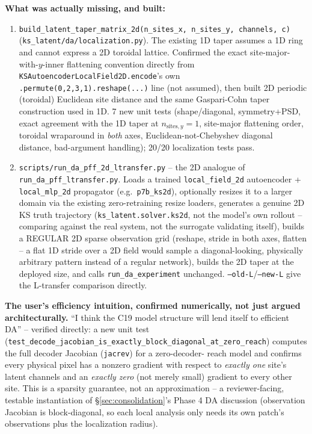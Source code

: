\documentclass[11pt]{article}
\begin{document}
\textbf{What was actually missing, and built:}
\begin{enumerate}[leftmargin=*]
\item \texttt{build\_latent\_taper\_matrix\_2d(n\_sites\_x, n\_sites\_y,
  channels, c)} (\texttt{ks\_latent/da/localization.py}). The existing
  1D taper assumes a 1D ring and cannot express a 2D toroidal lattice.
  Confirmed the exact site-major-with-$y$-inner flattening convention
  directly from \texttt{KSAutoencoderLocalField2D.encode}'s own
  \texttt{.permute(0,2,3,1).reshape(...)} line (not assumed), then built
  2D periodic (toroidal) Euclidean site distance and the same
  Gaspari-Cohn taper construction used in 1D. 7 new unit tests
  (shape/diagonal, symmetry+PSD, exact agreement with the 1D taper at
  $n_{\mathrm{sites},y}{=}1$, site-major flattening order, toroidal
  wraparound in \emph{both} axes, Euclidean-not-Chebyshev diagonal
  distance, bad-argument handling); 20/20 localization tests pass.
\item \texttt{scripts/run\_da\_pff\_2d\_ltransfer.py} -- the 2D analogue
  of \texttt{run\_da\_pff\_ltransfer.py}. Loads a trained
  \texttt{local\_field\_2d} autoencoder + \texttt{local\_mlp\_2d}
  propagator (e.g.\ \texttt{p7b\_ks2d}), optionally resizes it to a
  larger domain via the existing zero-retraining resize loaders,
  generates a genuine 2D KS truth trajectory
  (\texttt{ks\_latent.solver.ks2d}, not the model's own rollout --
  comparing against the real system, not the surrogate validating
  itself), builds a REGULAR 2D sparse observation grid (reshape,
  stride in both axes, flatten -- a flat 1D stride over a 2D field would
  sample a diagonal-looking, physically arbitrary pattern instead of a
  regular network), builds the 2D taper at the deployed size, and calls
  \texttt{run\_da\_experiment} unchanged. \texttt{--old-L}/\texttt{--new-L}
  give the L-transfer comparison directly.
\end{enumerate}

\textbf{The user's efficiency intuition, confirmed numerically, not just
argued architecturally.} ``I think the C19 model structure will lend
itself to efficient DA'' -- verified directly: a new unit test
(\texttt{test\_decode\_jacobian\_is\_exactly\_block\_diagonal\_at\_zero\_reach})
computes the full decoder Jacobian (\texttt{jacrev}) for a zero-decoder-
reach model and confirms every physical pixel has a nonzero gradient
with respect to \emph{exactly one} site's latent channels and an
\emph{exactly zero} (not merely small) gradient to every other site.
This is a sparsity guarantee, not an approximation -- a reviewer-facing,
testable instantiation of \S\ref{sec:consolidation}'s Phase 4 DA
discussion (observation Jacobian is block-diagonal, so each local
analysis only needs its own patch's observations plus the localization
radius).
\end{document}
